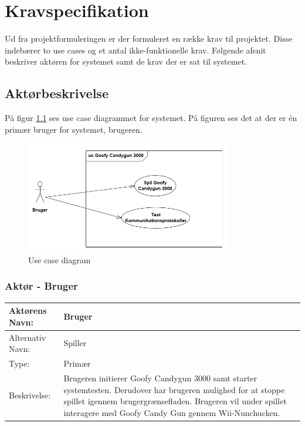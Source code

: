 \chapter{Kravspecifikation}
Ud fra projektformuleringen er der formuleret en række krav til projektet. Disse indebærer to use cases og et antal ikke-funktionelle krav. Følgende afsnit beskriver aktøren for systemet samt de krav der er sat til systemet.

\section{Aktørbeskrivelse}
På figur \ref{fig:useCaseDiagram} ses use case diagrammet for systemet. På figuren ses det at der er én primær bruger for systemet, brugeren. 

\begin{figure}[H]
	\centering
	\includegraphics[width=0.80\textwidth]{Kravsspecifikation/images/usecaseDiagram.png}
	\caption{Use case diagram}
	\label{fig:useCaseDiagram}
\end{figure}



\subsection{Aktør - Bruger}

\begin{tabularx}{\textwidth}{| p{2cm} | p{9.1cm} |}
	\hline
	Aktørens Navn: & Bruger \\ 
	\hline
	Alternativ Navn: & Spiller \\
	\hline
	Type: & Primær \\
	\hline
	Beskrivelse: & Brugeren initierer Goofy Candygun 3000 samt starter systemtesten. Derudover har brugeren mulighed for at stoppe spillet igennem brugergrænsefladen. Brugeren vil under spillet interagere med Goofy Candy Gun gennem Wii-Nunchucken.
	\\ \hline
\end{tabularx}

